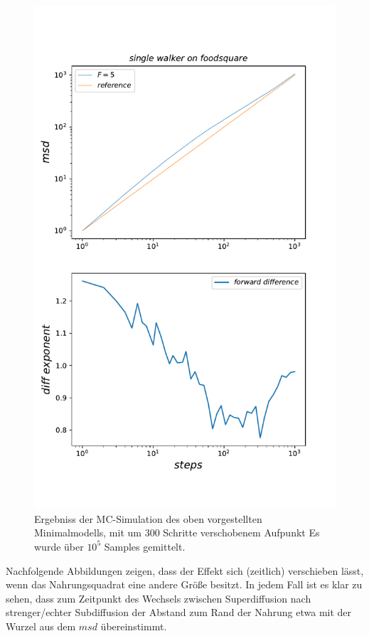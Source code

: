 \documentclass[a4paper, 12pt]{report}
\begin{document}
\begin{figure}[H]
	\centering
	\includegraphics[scale=0.75]{300shifted_single_walker_on20x20.pdf}
	\caption{Ergebniss der MC-Simulation des oben vorgestellten Minimalmodells, mit um 300 Schritte verschobenem Aufpunkt \break Es wurde über $10^5$ Samples gemittelt.}
\end{figure}


\noindent Nachfolgende Abbildungen zeigen, dass der Effekt sich (zeitlich) verschieben lässt, wenn das Nahrungsquadrat eine andere Größe besitzt. In jedem Fall ist es klar zu sehen, dass zum Zeitpunkt des Wechsels zwischen Superdiffusion nach strenger/echter Subdiffusion der Abstand zum Rand der Nahrung etwa mit der Wurzel aus dem $msd$ übereinstimmt.
\\
\end{document}
